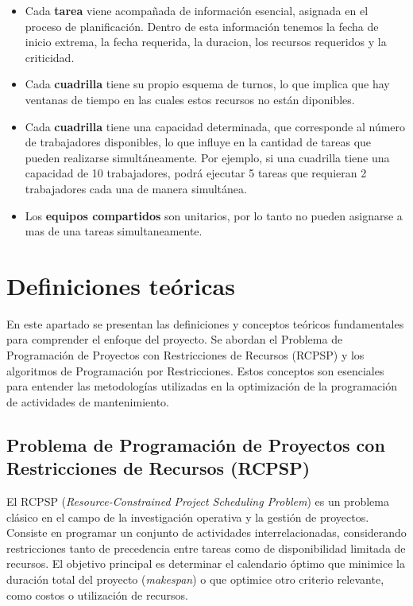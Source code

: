 \documentclass{article}
\begin{document}
\begin{itemize}
    \item Cada \textbf{tarea} viene acompañada de información esencial, asignada en el proceso de planificación. Dentro de esta información tenemos la fecha de inicio extrema, la fecha requerida, la duracion, los recursos requeridos y la criticidad.
    
    \item Cada \textbf{cuadrilla} tiene su propio esquema de turnos, lo que implica que hay ventanas de tiempo en las cuales estos recursos no están diponibles.
    
    \item Cada \textbf{cuadrilla} tiene una capacidad determinada, que corresponde al número de trabajadores disponibles, lo que influye en la cantidad de tareas que pueden realizarse simultáneamente. Por ejemplo, si una cuadrilla tiene una capacidad de 10 trabajadores, podrá ejecutar 5 tareas que requieran 2 trabajadores cada una de manera simultánea.
    
    \item Los \textbf{equipos compartidos} son unitarios, por lo tanto no pueden asignarse a mas de una tareas simultaneamente.
\end{itemize}

\section{Definiciones teóricas}
En este apartado se presentan las definiciones y conceptos teóricos fundamentales para comprender el enfoque del proyecto. Se abordan el Problema de Programación de Proyectos con Restricciones de Recursos (RCPSP) y los algoritmos de Programación por Restricciones. Estos conceptos son esenciales para entender las metodologías utilizadas en la optimización de la programación de actividades de mantenimiento.

\subsection{Problema de Programación de Proyectos con Restricciones de Recursos (RCPSP)}
El RCPSP (\textit{Resource-Constrained Project Scheduling Problem}) es un problema clásico en el campo de la investigación operativa y la gestión de proyectos. Consiste en programar un conjunto de actividades interrelacionadas, considerando restricciones tanto de precedencia entre tareas como de disponibilidad limitada de recursos. El objetivo principal es determinar el calendario óptimo que minimice la duración total del proyecto (\textit{makespan}) o que optimice otro criterio relevante, como costos o utilización de recursos.
\end{document}
